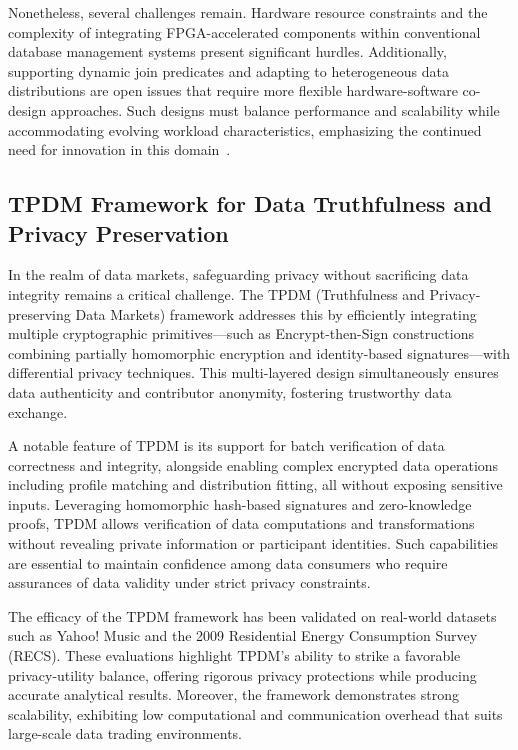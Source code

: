 \documentclass[sigconf]{acmart}
\begin{document}
Nonetheless, several challenges remain. Hardware resource constraints and the complexity of integrating FPGA-accelerated components within conventional database management systems present significant hurdles. Additionally, supporting dynamic join predicates and adapting to heterogeneous data distributions are open issues that require more flexible hardware-software co-design approaches. Such designs must balance performance and scalability while accommodating evolving workload characteristics, emphasizing the continued need for innovation in this domain~\cite{ref24}.

\subsection{TPDM Framework for Data Truthfulness and Privacy Preservation}

In the realm of data markets, safeguarding privacy without sacrificing data integrity remains a critical challenge. The TPDM (Truthfulness and Privacy-preserving Data Markets) framework addresses this by efficiently integrating multiple cryptographic primitives—such as Encrypt-then-Sign constructions combining partially homomorphic encryption and identity-based signatures—with differential privacy techniques. This multi-layered design simultaneously ensures data authenticity and contributor anonymity, fostering trustworthy data exchange.

A notable feature of TPDM is its support for batch verification of data correctness and integrity, alongside enabling complex encrypted data operations including profile matching and distribution fitting, all without exposing sensitive inputs. Leveraging homomorphic hash-based signatures and zero-knowledge proofs, TPDM allows verification of data computations and transformations without revealing private information or participant identities. Such capabilities are essential to maintain confidence among data consumers who require assurances of data validity under strict privacy constraints.

The efficacy of the TPDM framework has been validated on real-world datasets such as Yahoo! Music and the 2009 Residential Energy Consumption Survey (RECS). These evaluations highlight TPDM's ability to strike a favorable privacy-utility balance, offering rigorous privacy protections while producing accurate analytical results. Moreover, the framework demonstrates strong scalability, exhibiting low computational and communication overhead that suits large-scale data trading environments.
\end{document}
